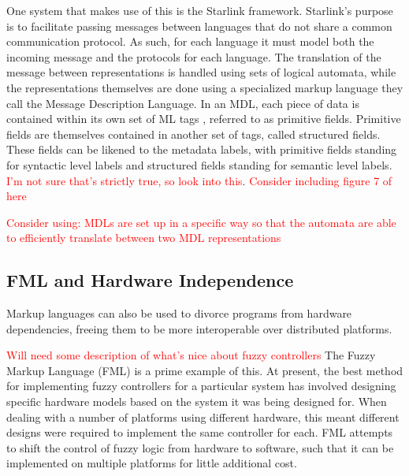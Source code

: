 \documentclass{sig-alternate}
\newcommand{\mycomment}[1]{\textcolor{red}{#1}}
\begin{document}
One system that makes use of this is the Starlink framework\cite{Bromberg:2011}. Starlink's purpose is to facilitate passing messages between languages that do not share a common communication protocol. As such, for each language it must model both the incoming message and the protocols for each language.
The translation of the message between representations is handled using sets of logical automata, while the representations themselves are done using a specialized markup language they call the Message Description Language. In an MDL, each piece of data is contained within its own set of ML tags , referred to as primitive fields. Primitive fields are themselves contained in another set of tags, called structured fields. These fields can be likened to the metadata labels, with primitive fields standing for syntactic level labels and structured fields standing for semantic level labels. \mycomment{I'm not sure that's strictly true, so look into this}.
\mycomment{Consider including figure 7 of \cite{Bromberg:2011} here}

\mycomment{Consider using: MDLs are set up in a specific way so that the automata are able to efficiently translate between two MDL representations}


\subsection*{FML and Hardware Independence}

Markup languages can also be used to divorce programs from hardware dependencies, freeing them to be more interoperable over distributed platforms.

\mycomment{Will need some description of what's nice about fuzzy controllers}
The Fuzzy Markup Language (FML) is a prime example of this. At present, the best method for implementing fuzzy controllers for a particular system has involved designing specific hardware models based on the system it was being designed for. When dealing with a number of platforms using different hardware, this meant different designs were required to implement the same controller for each. FML attempts to shift the control of fuzzy logic from hardware to software, such that it can be implemented on multiple platforms for little additional cost.
\end{document}
